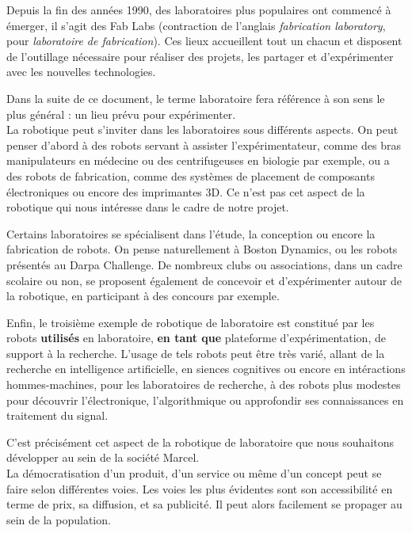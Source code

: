 \documentclass[a4paper,12pt]{report}
\begin{document}
Depuis la fin des années 1990, des laboratoires plus populaires ont commencé à émerger,
il s'agit des Fab Labs (contraction de l'anglais \emph{fabrication laboratory}, pour \emph{laboratoire de fabrication}).
Ces lieux accueillent tout un chacun et disposent de l'outillage nécessaire pour réaliser des projets, les partager et d'expérimenter avec les nouvelles technologies.

Dans la suite de ce document, le terme laboratoire fera référence à son sens le plus général : un lieu prévu pour expérimenter.\\

La robotique peut s'inviter dans les laboratoires sous différents aspects.
On peut penser d'abord à des robots servant à assister l'expérimentateur, comme des bras manipulateurs en médecine ou des centrifugeuses en biologie par exemple, 
ou a des robots de fabrication, comme des systèmes de placement de composants électroniques ou encore des imprimantes 3D.
Ce n'est pas cet aspect de la robotique qui nous intéresse dans le cadre de notre projet.

Certains laboratoires se spécialisent dans l'étude, la conception ou encore la fabrication de robots.
On pense naturellement à Boston Dynamics, ou les robots présentés au Darpa Challenge. 
De nombreux clubs ou associations, dans un cadre scolaire ou non, se proposent également de concevoir et d'expérimenter autour de la robotique, 
en participant à des concours par exemple.

Enfin, le troisième exemple de robotique de laboratoire est constitué par les robots \textbf{utilisés} en laboratoire, 
\textbf{en tant que} plateforme d'expérimentation, de support à la recherche.
L'usage de tels robots peut être très varié, allant de la recherche en intelligence artificielle, 
en siences cognitives ou encore en intéractions hommes-machines, pour les laboratoires de recherche, 
à des robots plus modestes pour découvrir l'électronique, l'algorithmique ou approfondir ses connaissances en traitement du signal.

C'est précisément cet aspect de la robotique de laboratoire que nous souhaitons développer au sein de la société Marcel.\\

La démocratisation d'un produit, d'un service ou même d'un concept peut se faire selon différentes voies. 
Les voies les plus évidentes sont son accessibilité en terme de prix, sa diffusion, et sa publicité.
Il peut alors facilement se propager au sein de la population.
\end{document}
